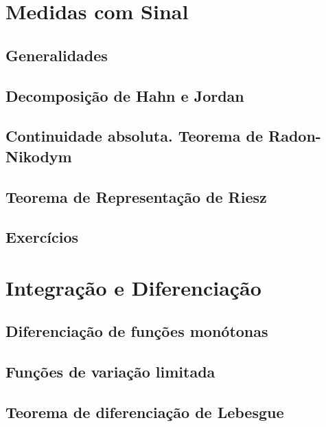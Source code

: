 \documentclass[
]{book}
\begin{document}
\chapter{Medidas com Sinal}\label{medidas-com-sinal}

\section{Generalidades}\label{generalidades}

\section{Decomposição de Hahn e Jordan}\label{decomposiuxe7uxe3o-de-hahn-e-jordan}

\section{Continuidade absoluta. Teorema de Radon-Nikodym}\label{continuidade-absoluta.-teorema-de-radon-nikodym}

\section{Teorema de Representação de Riesz}\label{teorema-de-representauxe7uxe3o-de-riesz}

\section*{Exercícios}\label{exercuxedcios-6}

\chapter{Integração e Diferenciação}\label{integrauxe7uxe3o-e-diferenciauxe7uxe3o}

\section{Diferenciação de funções monótonas}\label{diferenciauxe7uxe3o-de-funuxe7uxf5es-monuxf3tonas}

\section{Funções de variação limitada}\label{funuxe7uxf5es-de-variauxe7uxe3o-limitada}

\section{Teorema de diferenciação de Lebesgue}\label{teorema-de-diferenciauxe7uxe3o-de-lebesgue}
\end{document}
